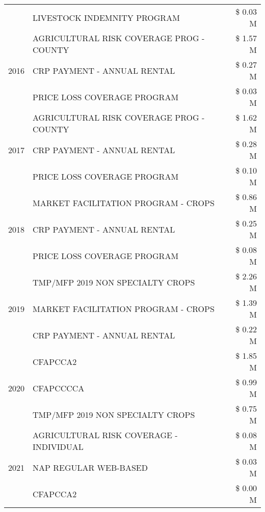 \begin{tabular}{llr}
 & LIVESTOCK INDEMNITY PROGRAM & \$ 0.03 M \\
\cline{1-3}
\multirow[t]{3}{*}{2016} & AGRICULTURAL RISK COVERAGE PROG - COUNTY & \$ 1.57 M \\
 & CRP PAYMENT - ANNUAL RENTAL & \$ 0.27 M \\
 & PRICE LOSS COVERAGE PROGRAM & \$ 0.03 M \\
\cline{1-3}
\multirow[t]{3}{*}{2017} & AGRICULTURAL RISK COVERAGE PROG - COUNTY & \$ 1.62 M \\
 & CRP PAYMENT - ANNUAL RENTAL & \$ 0.28 M \\
 & PRICE LOSS COVERAGE PROGRAM & \$ 0.10 M \\
\cline{1-3}
\multirow[t]{3}{*}{2018} & MARKET FACILITATION PROGRAM - CROPS & \$ 0.86 M \\
 & CRP PAYMENT - ANNUAL RENTAL & \$ 0.25 M \\
 & PRICE LOSS COVERAGE PROGRAM & \$ 0.08 M \\
\cline{1-3}
\multirow[t]{3}{*}{2019} & TMP/MFP 2019 NON SPECIALTY CROPS & \$ 2.26 M \\
 & MARKET FACILITATION PROGRAM - CROPS & \$ 1.39 M \\
 & CRP PAYMENT - ANNUAL RENTAL & \$ 0.22 M \\
\cline{1-3}
\multirow[t]{3}{*}{2020} & CFAPCCA2 & \$ 1.85 M \\
 & CFAPCCCCA & \$ 0.99 M \\
 & TMP/MFP 2019 NON SPECIALTY CROPS & \$ 0.75 M \\
\cline{1-3}
\multirow[t]{3}{*}{2021} & AGRICULTURAL RISK COVERAGE - INDIVIDUAL & \$ 0.08 M \\
 & NAP REGULAR WEB-BASED & \$ 0.03 M \\
 & CFAPCCA2 & \$ 0.00 M \\
\cline{1-3}
\bottomrule
\end{tabular}
